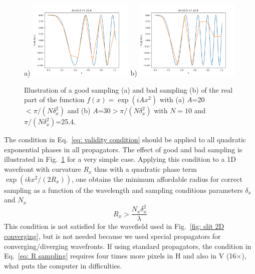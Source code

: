\documentclass{iucr}              %
\begin{document}
\begin{figure}
\label{fig: phase sampling}
\caption{Illustration of a good sampling (a) and bad sampling (b) of the real part of the function $f(x)=\exp(i A x^2)$ with (a) $A$=20$< \pi / (N \delta_x^2)$ and (b) $A$=30$ > \pi / (N \delta_x^2)$ with $N=10$ and $\pi / (N \delta_x^2)$=25.4. 
}
a)
\includegraphics[width=0.45\textwidth]{sample_quadratic_phase_A20.png}
b)
\includegraphics[width=0.45\textwidth]{sample_quadratic_phase_A30.png}
\end{figure}

The condition in Eq.~\ref{eq: validity condition} should be applied to all quadratic exponential phases in all propagators. The effect of good and bad sampling is illustrated in Fig.~\ref{fig: phase sampling} for a very simple case. Applying this condition to a 1D wavefront with curvature $R_x$ thus with a quadratic phase term $\exp(i k x^2 /  (2 R_x))$, one obtains the minimum affordable radius for correct sampling as a function of the wavelength and sampling conditions parameters $\delta_x$ and $N_x$
\begin{equation}\label{eq: R sampling}
    R_x > \frac{N_x \delta_x^2}{\lambda}
\end{equation}
This condition is not satisfied for the wavefield used in Fig.~\ref{fig: slit 2D converging}, but is not needed because we used special propagators for converging/diverging wavefronts. If using standard propagators, the condition in Eq.~\ref{eq: R sampling} requires four times more pixels in H and also in V (16$\times$), what puts the computer in difficulties. 
\end{document}
